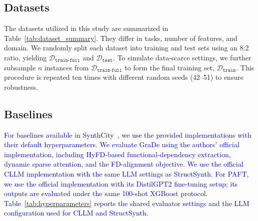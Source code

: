 \begin{table}[t]
\centering
{}%
\caption{Summary of Dataset Characteristics.}
\label{tab:dataset_summary}
\end{table}

\subsection{Datasets}
\label{app:datasets}
The datasets utilized in this study are summarized in Table~\ref{tab:dataset_summary}. They differ in tasks, number of features, and domain. We randomly split each dataset into training and test sets using an 8:2 ratio, yielding $\mathcal{D}_\mathtt{train\text{-}full}$ and $\mathcal{D}_\mathtt{test}$. To simulate data-scarce settings, we further subsample $n$ instances from $\mathcal{D}_\mathtt{train\text{-}full}$ to form the final training set, $\mathcal{D}_\mathtt{train}$. This procedure is repeated ten times with different random seeds (42--51) to ensure robustness.

\subsection{Baselines}
\label{app:baselines}
\textcolor{blue}{For baselines available in SynthCity~\cite{qian2023synthcity}, we use the provided implementations with their default hyperparameters. We evaluate GraDe using the authors' official implementation, including HyFD-based functional-dependency extraction, dynamic sparse attention, and the FD-alignment objective. We use the official CLLM implementation with the same LLM settings as \textsf{StructSynth}. For PAFT, we use the official implementation with its DistilGPT2 fine-tuning setup; its outputs are evaluated under the same 100-shot XGBoost protocol. Table~\ref{tab:hyperparameters} reports the shared evaluator settings and the LLM configuration used for CLLM and \textsf{StructSynth}.}

